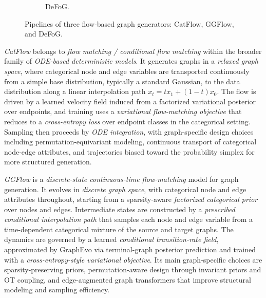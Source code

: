 \documentclass{article}
\begin{document}
\begin{figure}[htbp]
\begin{subfigure}[t]{\textwidth}
\caption{DeFoG.}
\end{subfigure}

\caption{Pipelines of three flow-based graph generators: CatFlow, GGFlow, and DeFoG.}
\label{fig:catflow_ggflow_defog_pipelines}
\end{figure}
\emph{CatFlow} \cite{eijkelboom2024vfm} belongs to \emph{flow matching / conditional flow matching} within the broader family of \emph{ODE-based deterministic models}. It generates graphs in a \emph{relaxed graph space}, where categorical node and edge variables are transported continuously from a simple base distribution, typically a standard Gaussian, to the data distribution along a linear interpolation path $x_t = tx_1 +(1-t)x_0$. The flow is driven by a learned velocity field induced from a factorized variational posterior over endpoints, and training uses a \emph{variational flow-matching objective} that reduces to a \emph{cross-entropy loss} over endpoint classes in the categorical setting. Sampling then proceeds by \emph{ODE integration}, with graph-specific design choices including permutation-equivariant modeling, continuous transport of categorical node-edge attributes, and trajectories biased toward the probability simplex for more structured generation.


\emph{GGFlow} \cite{hou2024ggflow} is a \emph{discrete-state continuous-time flow-matching} model for graph generation. It evolves in \emph{discrete graph space}, with categorical node and edge attributes throughout, starting from a sparsity-aware \emph{factorized categorical prior} over nodes and edges. Intermediate states are constructed by a \emph{prescribed conditional interpolation path} that samples each node and edge variable from a time-dependent categorical mixture of the source and target graphs. The dynamics are governed by a learned \emph{conditional transition-rate field}, approximated by GraphEvo via terminal-graph posterior prediction and trained with a \emph{cross-entropy-style variational objective}. Its main graph-specific choices are sparsity-preserving priors, permutation-aware design through invariant priors and OT coupling, and edge-augmented graph transformers that improve structural modeling and sampling efficiency.
\end{document}
